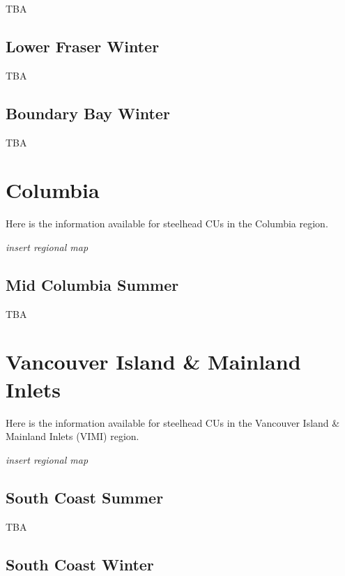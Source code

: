 \documentclass[
]{book}
\begin{document}
TBA

\hypertarget{lower-fraser-winter}{%
\section{Lower Fraser Winter}\label{lower-fraser-winter}}

TBA

\hypertarget{boundary-bay-winter}{%
\section{Boundary Bay Winter}\label{boundary-bay-winter}}

TBA

\hypertarget{col}{%
\chapter{Columbia}\label{col}}

Here is the information available for steelhead CUs in the Columbia region.

\emph{insert regional map}

\hypertarget{mid-columbia-summer}{%
\section{Mid Columbia Summer}\label{mid-columbia-summer}}

TBA

\hypertarget{vimi}{%
\chapter{Vancouver Island \& Mainland Inlets}\label{vimi}}

Here is the information available for steelhead CUs in the Vancouver Island \& Mainland Inlets (VIMI) region.

\emph{insert regional map}

\hypertarget{south-coast-summer}{%
\section{South Coast Summer}\label{south-coast-summer}}

TBA

\hypertarget{south-coast-winter}{%
\section{South Coast Winter}\label{south-coast-winter}}
\end{document}

